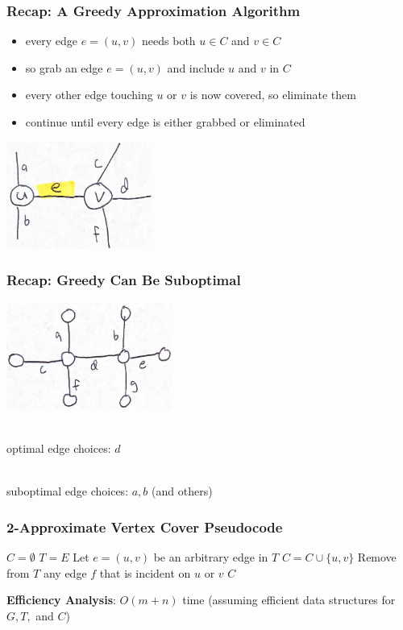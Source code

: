 \documentclass[10pt,aspectratio=169]{beamer}
\newcommand{\stanza}{ \\~\ }
\begin{document}
\begin{frame} \frametitle{Recap: A Greedy Approximation Algorithm}
\begin{itemize}
  \item every edge $e=(u,v)$ needs both $u \in C$ and $v \in C$
  \item so grab an edge $e=(u,v)$ and include $u$ and $v$ in $C$
  \item every other edge touching $u$ or $v$ is now covered, so eliminate them
  \item continue until every edge is either grabbed or eliminated
\end{itemize}
\begin{center}
  \includegraphics[height=100pt]{vertex-cover-greedy.png}
\end{center}
\end{frame}

\begin{frame} \frametitle{Recap: Greedy Can Be Suboptimal}
\begin{center}
  \includegraphics[height=100pt]{vertex-cover-counterexample.png}
  \stanza
  
  optimal edge choices: $d$ \stanza

  suboptimal edge choices: $a, b$ (and others)

\end{center}
\end{frame}
  
\begin{frame} \frametitle{2-Approximate Vertex Cover Pseudocode}
  \begin{algorithmic}[1]
      \State $C=\emptyset$
      \State $T=E$ 
        \State Let $e=(u, v)$ be an arbitrary edge in $T$
        \State $C = C \cup \{u, v \}$
        \State Remove from $T$ any edge $f$ that is incident on $u$ or $v$
      \EndWhile
      \State \Return $C$
    \EndFunction
  \end{algorithmic}
\vspace{.5cm}
\textbf{Efficiency Analysis}: $O(m+n)$ time (assuming efficient data structures
for $G, T,$ and $C$)
\end{frame}
\end{document}
